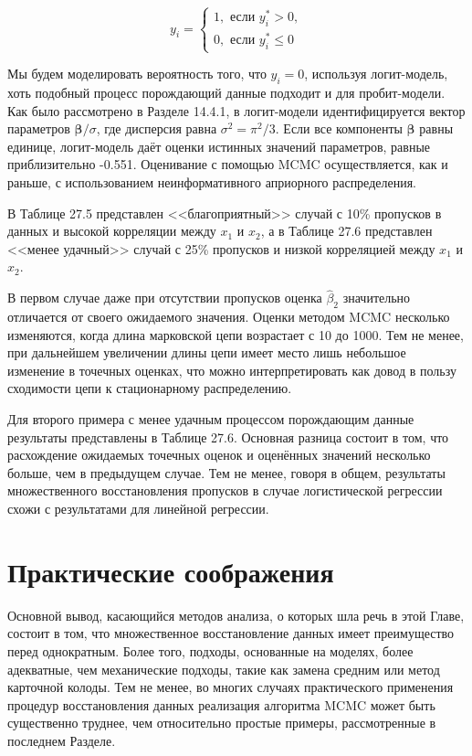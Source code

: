 \begin{equation}
y_i=
\begin{cases}
1, \text{ если } y_i^*>0, \\
0, \text{ если } y_i^*\leqslant 0
\end{cases}
\end{equation}



Мы будем моделировать вероятность того, что $y_i=0$, используя логит-модель, хоть подобный процесс порождающий данные подходит и для пробит-модели. Как было рассмотрено в Разделе 14.4.1, в логит-модели идентифицируется вектор параметров $\mathbf{\beta}/\sigma$, где дисперсия равна $\sigma^2=\pi^2/3$. Если все компоненты $\mathbf{\beta}$ равны единице, логит-модель даёт оценки истинных значений параметров, равные приблизительно -0.551. Оценивание с помощью MCMC осуществляется, как и раньше, с использованием неинформативного априорного распределения.

В Таблице 27.5 представлен <<благоприятный>> случай с 10\% пропусков в данных и высокой корреляции между $x_1$ и $x_2$, а в Таблице 27.6 представлен <<менее удачный>> случай с 25\% пропусков и низкой корреляцией между $x_1$ и $x_2$.

В первом случае даже при отсутствии пропусков оценка $\widehat{\beta}_2$ значительно отличается от своего ожидаемого значения. Оценки методом MCMC несколько изменяются, когда длина марковской цепи возрастает с 10 до 1000. Тем не менее, при дальнейшем увеличении длины цепи имеет место лишь небольшое изменение в точечных оценках, что можно интерпретировать как довод в пользу сходимости цепи к стационарному распределению.

Для второго примера с менее удачным процессом порождающим данные результаты представлены в Таблице 27.6. Основная разница состоит в том, что расхождение ожидаемых точечных оценок и оценённых значений несколько больше, чем в предыдущем случае. Тем не менее, говоря в общем, результаты множественного восстановления пропусков в случае логистической регрессии схожи с результатами для линейной регрессии.



\section{Практические соображения}

Основной вывод, касающийся методов анализа, о которых шла речь в этой Главе, состоит в том, что множественное восстановление данных имеет преимущество перед однократным. Более того, подходы, основанные на моделях, более адекватные, чем механические подходы, такие как замена средним или метод карточной колоды. Тем не менее, во многих случаях практического применения процедур восстановления данных  реализация алгоритма MCMC может быть существенно труднее, чем относительно простые примеры, рассмотренные в последнем Разделе.

